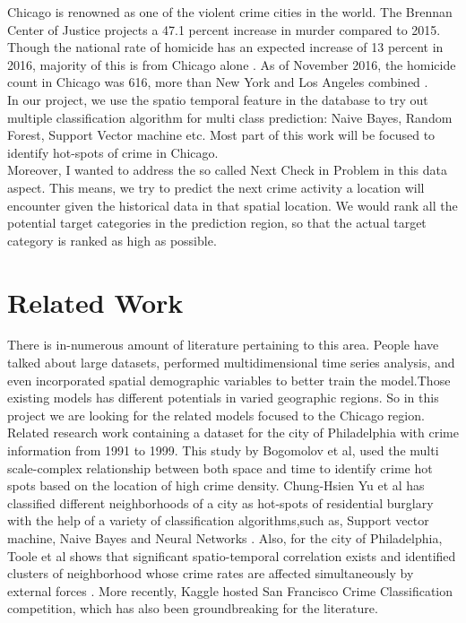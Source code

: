 \documentclass[conference]{IEEEtran}
\begin{document}
Chicago is renowned as one of the violent crime cities in the world. The Brennan Center of Justice projects a 47.1 percent increase in murder compared to 2015.\cite{b6} Though the national rate of homicide has an expected increase of 13 percent in 2016, majority of this  is from Chicago alone \cite{b6}. As of November 2016, the homicide count in Chicago was 616, more than New York and Los Angeles combined \cite{b7}. \\

In our project, we use the spatio temporal feature in the database to try out multiple classification algorithm for multi class prediction: Naive Bayes, Random Forest, Support Vector machine etc. Most part of this work will be focused to identify hot-spots of  crime in Chicago.\\

Moreover, I wanted to address the so called Next Check in Problem in this data aspect. This means, we try to predict the next crime activity a location will encounter given the historical data in that spatial location. We would rank all the potential target categories in the prediction region, so that the actual target category is ranked as high as possible.\\  

\section{Related Work}
There is in-numerous amount of literature pertaining to this area. People have talked about large datasets, performed multidimensional time series analysis, and even incorporated spatial demographic variables to better train the model.Those existing models has different potentials in varied geographic regions. So in this project we are looking for the related models focused to the Chicago region. \\

Related research work containing a dataset for the city of Philadelphia with crime information from 1991 to 1999. This study\cite{b8} by Bogomolov et al, used the multi scale-complex relationship between both space and time to identify crime hot spots based on the location of high crime density. Chung-Hsien Yu et al has classified different neighborhoods of a city as hot-spots of residential burglary with the help of a variety of classification algorithms,such as, Support vector machine, Naive Bayes and Neural Networks \cite{b9} . Also, for the city of Philadelphia, Toole et al shows that significant spatio-temporal correlation exists and identified clusters of neighborhood whose crime rates are affected simultaneously by external forces \cite{b10}. More recently, Kaggle hosted San Francisco Crime Classification competition, which has also been groundbreaking for the literature.\\
\end{document}
